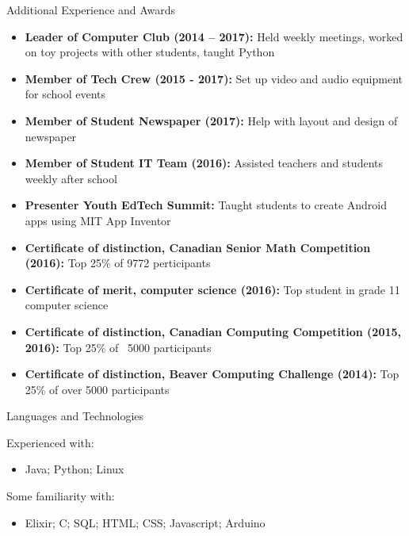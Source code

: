 \documentclass[]{mcdowellcv}
\begin{document}
	\begin{cvsection}{Additional Experience and Awards}
		\begin{cvsubsection}{}{}{}
			\begin{itemize}
				\item \textbf{Leader of Computer Club (2014 – 2017):} Held weekly meetings, worked on toy projects with other students, taught Python
				\item \textbf{Member of Tech Crew (2015 - 2017):} Set up video and audio equipment for school events
				\item \textbf{Member of Student Newspaper (2017):} Help with layout and design of newspaper
				\item \textbf{Member of Student IT Team (2016):} Assisted teachers and students weekly after school
				\item \textbf{Presenter Youth EdTech Summit:} Taught students to create Android apps using MIT App Inventor
				\item \textbf{Certificate of distinction, Canadian Senior Math Competition (2016):} Top 25\% of 9772 perticipants
				\item \textbf{Certificate of merit, computer science (2016):} Top student in grade 11 computer science
				\item \textbf{Certificate of distinction, Canadian Computing Competition (2015, 2016):} Top 25\% of ~5000 participants
				\item \textbf{Certificate of distinction, Beaver Computing Challenge (2014):} Top 25\% of over 5000 participants
			\end{itemize}
		\end{cvsubsection}
	\end{cvsection}

	\begin{cvsection}{Languages and Technologies}
		\begin{cvsubsection}{}{}{}
            Experienced with:
			\begin{itemize}
				\item Java; Python; Linux
            \end{itemize}
            Some familiarity with:
            \begin{itemize}
                \item Elixir; C; SQL; HTML; CSS; Javascript; Arduino
			\end{itemize}
		\end{cvsubsection}
	\end{cvsection}
\end{document}
